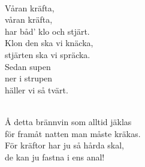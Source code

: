 \newpage


 \\       

\songtext{} 
Våran kräfta,\\
våran kräfta,\\
har båd' klo och stjärt.\\
Klon den ska vi knäcka,\\
stjärten ska vi spräcka.\\
Sedan supen\\
ner i strupen\\
häller vi så tvärt.\\



 \\       

\songtext{} 
Å detta brännvin som alltid jäklas\\
för framåt natten man måste kräkas.\\
För kräftor har ju så hårda skal,\\
de kan ju fastna i ens anal!
